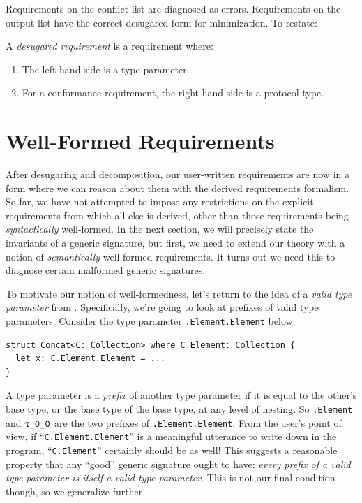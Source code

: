 \documentclass[../generics]{subfiles}
\begin{document}
Requirements on the conflict list are diagnosed as errors. Requirements on the output list have the correct desugared form for minimization. To restate:
\begin{definition}\label{desugaredrequirementdef}
A \emph{desugared requirement} is a requirement where:
\begin{enumerate}
\item The left-hand side is a type parameter.
\item For a conformance requirement, the right-hand side is a protocol type.
\end{enumerate}
\end{definition}

\section{Well-Formed Requirements}\label{generic signature validity}

After desugaring and decomposition, our user-written requirements are now in a form where we can reason about them with the derived requirements formalism. So far, we have not attempted to impose any restrictions on the explicit requirements from which all else is derived, other than those requirements being \emph{syntactically} well-formed. In the next section, we will precisely state the invariants of a generic signature, but first, we need to extend our theory with a notion of \emph{semantically} well-formed requirements. It turns out we need this to diagnose certain malformed generic signatures.

To motivate our notion of well-formedness, let's return to the idea of a \emph{valid type parameter} from . Specifically, we're going to look at prefixes of valid type parameters. Consider the type parameter \texttt{\rT.Element.Element} below:
\begin{Verbatim}
struct Concat<C: Collection> where C.Element: Collection {
  let x: C.Element.Element = ...
}
\end{Verbatim}

A type parameter is a \emph{prefix} of another type parameter if it is equal to the other's base type, or the base type of the base type, at any level of nesting. So \texttt{\rT.Element} and $\rT$ are the two prefixes of \texttt{\rT.Element.Element}. From the user's point of view, if ``\texttt{C.Element.Element}'' is a meaningful utterance to write down in the program, ``\texttt{C.Element}'' certainly should be as well! This suggests a reasonable property that any ``good'' generic signature ought to have: \textsl{every prefix of a valid type parameter is itself a valid type parameter}. This is not our final condition though, so we generalize further.
\end{document}
